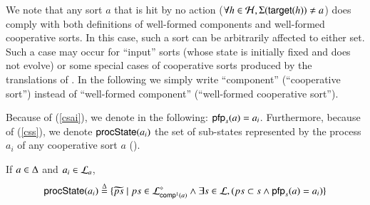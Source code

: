 

We note that any sort $a$ that is hit by no action (\ie $\forall h \in \PHh, \PHsort(\target{h}) \neq a$)
does comply with both definitions of well-formed components and well-formed cooperative sorts.
In this case, such a sort can be arbitrarily affected to either set.
Such a case may occur for “input” sorts (whose state is initially fixed and does not evolve)
or some special cases of cooperative sorts produced by the translations of .
In the following we simply write “component” (\resp “cooperative sort”) instead of “well-formed component” (\resp “well-formed cooperative sort”).

Because of (\ref{csai}), we denote in the following: $\pfp_s(a) = a_i$.
Furthermore, because of (\ref{css}), we denote $\csState(a_i)$ the set of sub-states represented by the process $a_i$ of any cooperative sort $a$ ().
\begin{definition}[$\csState : \PHproc \rightarrow \powerset(\PHproc)$]
\label{def:csState}
  If $a \in \cs$ and $a_i \in \PHl_a$, 
  $$\csState(a_i) \DEF \{ \toset{ps} \mid ps\in\PHsubl[\PHl]_{\compin(a)} \wedge
  							\exists s\in\PHl, (ps\subset s\wedge \pfp_s(a)=a_i)
							\}$$
\end{definition}

%



